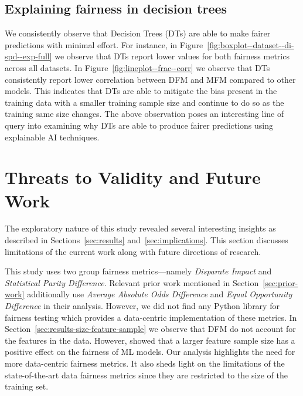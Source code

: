\documentclass[conference,review,anonymous]{IEEEtran}
\begin{document}
\subsection{Explaining fairness in decision trees}\label{sec:discuss-explain-fair-dt}


We consistently observe that Decision Trees (DTs) are able to make
fairer predictions with minimal effort. For instance, in
Figure \ref{fig:boxplot--dataset--di-spd--exp-full} we observe that
DTs report lower values for both fairness metrics across all
datasets. In Figure \ref{fig:lineplot--frac--corr} we observe that DTs
consistently report lower correlation between DFM and MFM compared to
other models. This indicates that DTs are able to mitigate the bias
present in the training data with a smaller training sample size and
continue to do so as the training same size changes. The above
observation poses an interesting line of query into examining why DTs
are able to produce fairer predictions using explainable AI
techniques.

\section{Threats to Validity and Future Work}\label{sec:threats}
The exploratory nature of this study revealed several interesting
insights as described in Sections~\ref{sec:results}
and~\ref{sec:implications}. This section discusses limitations of the
current work along with future directions of research.



This study uses two group fairness metrics---namely \emph{Disparate
Impact} and \emph{Statistical Parity Difference}. Relevant prior work
mentioned in Section \ref{sec:prior-work} additionally use
\emph{Average Absolute Odds Difference} and \emph{Equal Opportunity
Difference} in their analysis. However, we did not find any Python
library for fairness testing which provides a data-centric
implementation of these metrics. In
Section \ref{sec:results-size-feature-sample} we observe that DFM do
not account for the features in the data. However,
\cite{zhang2021ignorance} showed that a larger feature sample
size has a positive effect on the fairness of ML models. Our analysis
highlights the need for more data-centric fairness metrics. It also
sheds light on the limitations of the state-of-the-art data fairness
metrics since they are restricted to the size of the training set.
\end{document}
